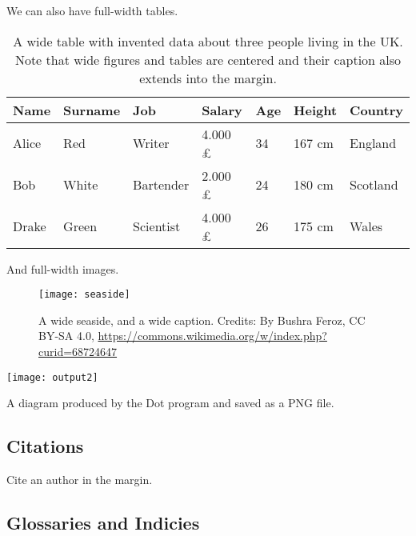 We can also have full-width tables.

\begin{table*}[h!]
    \caption{A wide table with invented data about three people living in the UK. Note that wide figures and tables are centered and their caption also extends into the margin.}
    \begin{tabular}{p{2.0cm} p{2.0cm} p{2.0cm} p{2.0cm} p{2.0cm} p{2.0cm} p{1.5cm}}
        \toprule
        Name    & Surname   & Job       & Salary           & Age   & Height    & Country \\
        \midrule
        Alice   & Red       & Writer    & 4.000 \pounds    & 34    & 167 cm     & England \\
        Bob     & White     & Bartender & 2.000 \pounds    & 24    & 180 cm     & Scotland \\
        Drake   & Green     & Scientist & 4.000 \pounds    & 26    & 175 cm     & Wales \\
        \bottomrule
    \end{tabular}
\end{table*}

And full-width images.

\blindtext

\begin{figure*}[h!]
	\texttt{[image: seaside]}
	\caption[A wide seaside]{A wide seaside, and a wide caption.
		Credits: By Bushra Feroz, CC BY-SA 4.0, \url{https://commons.wikimedia.org/w/index.php?curid=68724647}}
\end{figure*}

\begin{marginfigure}
	\texttt{[image: output2]}
	\caption[A Dot diagram]{A diagram produced by the Dot program and saved as a PNG file.}
\end{marginfigure}

%
\subsection{Citations}
Cite an author in the margin.

\blindtext


%
\subsection{Glossaries and Indicies}

